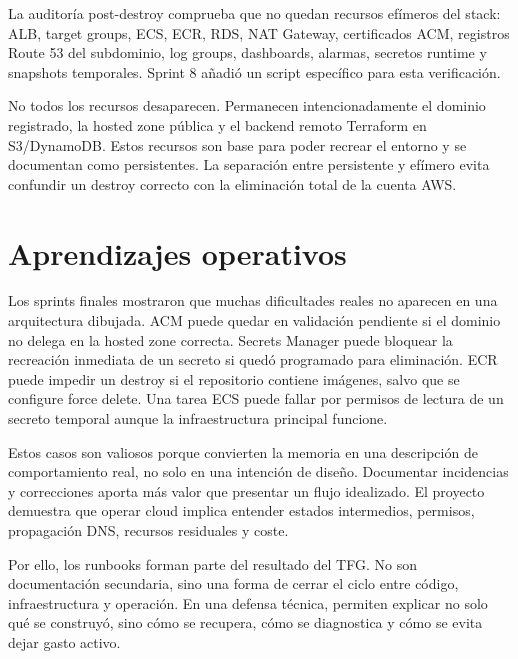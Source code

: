 La auditoría post-destroy comprueba que no quedan recursos efímeros del stack: ALB, target groups, ECS, ECR, RDS, NAT Gateway, certificados ACM, registros Route 53 del subdominio, log groups, dashboards, alarmas, secretos runtime y snapshots temporales. Sprint 8 añadió un script específico para esta verificación.

No todos los recursos desaparecen. Permanecen intencionadamente el dominio registrado, la hosted zone pública y el backend remoto Terraform en S3/DynamoDB. Estos recursos son base para poder recrear el entorno y se documentan como persistentes. La separación entre persistente y efímero evita confundir un destroy correcto con la eliminación total de la cuenta AWS.

\section{Aprendizajes operativos}
\label{sec:aprendizajes-operativos}

Los sprints finales mostraron que muchas dificultades reales no aparecen en una arquitectura dibujada. ACM puede quedar en validación pendiente si el dominio no delega en la hosted zone correcta. Secrets Manager puede bloquear la recreación inmediata de un secreto si quedó programado para eliminación. ECR puede impedir un destroy si el repositorio contiene imágenes, salvo que se configure force delete. Una tarea ECS puede fallar por permisos de lectura de un secreto temporal aunque la infraestructura principal funcione.

Estos casos son valiosos porque convierten la memoria en una descripción de comportamiento real, no solo en una intención de diseño. Documentar incidencias y correcciones aporta más valor que presentar un flujo idealizado. El proyecto demuestra que operar cloud implica entender estados intermedios, permisos, propagación DNS, recursos residuales y coste.

Por ello, los runbooks forman parte del resultado del TFG. No son documentación secundaria, sino una forma de cerrar el ciclo entre código, infraestructura y operación. En una defensa técnica, permiten explicar no solo qué se construyó, sino cómo se recupera, cómo se diagnostica y cómo se evita dejar gasto activo.
